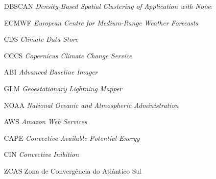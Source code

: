 \begin{siglas}
  \item[DBSCAN] \textit{Density-Based Spatial Clustering of Application with Noise}
  \item[ECMWF] \textit{European Centre for Medium-Range Weather Forecasts}
  \item[CDS] \textit{Climate Data Store}
  \item[CCCS] \textit{Copernicus Climate Change Service}
  \item[ABI] \textit{Advanced Baseline Imager}
  \item[GLM] \textit{Geoestationary Lightning Mapper}
  \item[NOAA] \textit{National Oceanic and Atmospheric Administration}
  \item[AWS] \textit{Amazon Web Services}
  \item[CAPE] \textit{Convective Available Potential Energy}
  \item[CIN] \textit{Convective Inibition}
  \item[ZCAS] Zona de Convergência do Atlântico Sul
\end{siglas}
